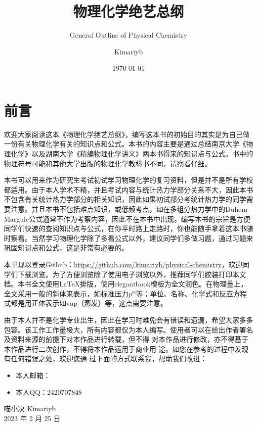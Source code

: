 \documentclass[lang=cn,newtx,11pt,scheme=chinese]{elegantbook}
\title{物理化学绝艺总纲}
\subtitle{General Outline of Physical Chemistry}
\author{Kimariyb}
\date{\today}
\begin{document}
\maketitle
\frontmatter
\tableofcontents
\mainmatter

\chapter*{前言}

欢迎大家阅读这本《物理化学绝艺总纲》，编写这本书的初始目的其实是为自己做一份有关物理化学有关的知识点和公式。本书的内容主要是通过总结南京大学《物理化学》以及湖南大学《精编物理化学讲义》两本书得来的知识点与公式。书中的物理符号可能和其他大学出版的物理化学教科书不同，请察看仔细。

本书可以用来作为研究生考试初试学习物理化学的复习资料，但是并不是所有学校都适用。由于本人学术不精，并且考试内容与统计热力学部分关系不大，因此本书不包含有关统计热力学部分的相关知识，因此如果初试部分考统计热力学的同学需要注意。并且本书不包括难点知识，或低频考点，如在多组分热力学中的Duhem-Margule公式通常不作为考察内容，因此不在本书中出现。编写本书的宗旨是方便同学们快速的查阅知识点与公式，在你平时路上走路时，你也能随手拿着这本书随时察看。当然学习物理化学除了多看公式以外，建议同学们多做习题，通过习题来巩固知识点和公式，这是非常有必要的。

本书现以登录Github：\url{https://github.com/kimariyb/physical-chemistry}，欢迎同学们下载浏览。为了方便浏览除了使用电子浏览以外，推荐同学们胶装打印本文档。本书全文使用\LaTeX 排版，使用elegantbook模板为全文润色。在物理量上，全文采用一般的斜体来表示，如标准压力$p^\ominus$等；单位、名称、化学式和反应方程式都是用正体表示如$\mathrm{vap}$（蒸发）等，这点需要注意。

由于本人并不是化学专业出生，因此在学习时难免会有错误和遗漏，希望大家多多包容。该工作工作量极大，所有内容都仅为本人编写。使用者可以在给出作者署名及资料来源的前提下对本作品进行转载，但不得
对本作品进行修改，亦不得基于本作品进行二次创作，不得将本作品运用于商业用
途。如您在参考的过程中发现有任何错误之处，欢迎您通
过下面的方式联系我，帮助我们改进：


\begin{itemize}
	\item 本人邮箱：
	\item 本人QQ：2420707848
\end{itemize}


\begin{flushright}
	喵小决 Kimariyb \\
	2023 年 2 月 25 日
\end{flushright}
\end{document}

